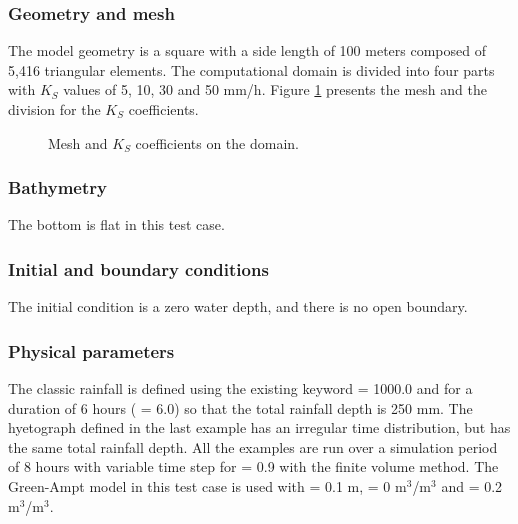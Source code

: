 \subsubsection{Geometry and mesh}

The model geometry is a square with a side length of 100 meters composed of
5,416 triangular elements.
The computational domain is divided into four parts with $K_S$ values of 5, 10,
30 and 50 mm/h. Figure \ref{pluiehorton:fig:mesh:KS} presents the mesh and the
division for the $K_S$ coefficients.

\begin{figure}[H]
\begin{minipage}[t]{0.5\textwidth}
 \centering
\end{minipage}%
\begin{minipage}[t]{0.5\textwidth}
 \centering
\end{minipage}
 \caption{Mesh and $K_S$ coefficients on the domain.}
 \label{pluiehorton:fig:mesh:KS}
\end{figure}

\subsubsection{Bathymetry}

The bottom is flat in this test case.

\subsubsection{Initial and boundary conditions}

The initial condition is a zero water depth, and there is no open boundary.

\subsubsection{Physical parameters}

The classic rainfall is defined using the existing keyword
 = 1000.0 and for a duration of 6
hours ( = 6.0) so that the
total rainfall depth is 250 mm.
The hyetograph defined in the last example has an irregular time distribution,
but has the same total rainfall depth.
All the examples are run over a simulation period of 8 hours with variable time
step for  = 0.9 with the finite volume method.
The Green-Ampt model in this test case is used with  = 0.1 m,
 = 0 m$^3$/m$^3$
and  = 0.2 m$^3$/m$^3$.

